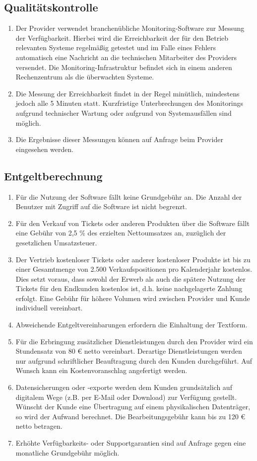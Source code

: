 \documentclass{terms}
\begin{document}
\subsection{Qualitätskontrolle}
\begin{enumerate}
\item Der Provider verwendet branchenübliche Monitoring-Software zur Messung der Verfügbarkeit. Hierbei wird die Erreichbarkeit der für den Betrieb relevanten Systeme regelmäßig getestet und im Falle eines Fehlers automatisch eine Nachricht an die technischen Mitarbeiter des Providers versendet. Die Monitoring-Infrastruktur befindet sich in einem anderen Rechenzentrum als die überwachten Systeme.
\item Die Messung der Erreichbarkeit findet in der Regel minütlich, mindestens jedoch alle 5 Minuten statt. Kurzfristige Unterbrechungen des Monitorings aufgrund technischer Wartung oder aufgrund von Systemausfällen sind möglich.
\item Die Ergebnisse dieser Messungen können auf Anfrage beim Provider eingesehen werden.
\end{enumerate}

\subsection{Entgeltberechnung}
\label{entgelt}
\begin{enumerate}
\item Für die Nutzung der Software fällt keine Grundgebühr an. Die Anzahl der Benutzer mit Zugriff auf die Software ist nicht begrenzt.
\item Für den Verkauf von Tickets oder anderen Produkten über die Software fällt eine Gebühr von 2,5 \% des erzielten Nettoumsatzes an, zuzüglich der gesetzlichen Umsatzsteuer.
\item Der Vertrieb kostenloser Tickets oder anderer kostenloser Produkte ist bis zu einer Gesamtmenge von 2.500 Verkaufspositionen pro Kalenderjahr kostenlos. Dies setzt voraus, dass sowohl der Erwerb als auch die spätere Nutzung der Tickets für den Endkunden kostenlos ist, d.h. keine nachgelagerte Zahlung erfolgt. Eine Gebühr für höhere Volumen wird zwischen Provider und Kunde individuell vereinbart.
\item Abweichende Entgeltvereinbarungen erfordern die Einhaltung der Textform.
\item Für die Erbringung zusätzlicher Dienstleistungen durch den Provider wird ein Stundensatz von 80 € netto vereinbart. Derartige Dienstleistungen werden nur aufgrund schriftlicher Beauftragung durch den Kunden durchgeführt. Auf Wunsch kann ein Kostenvoranschlag angefertigt werden.
\item Datensicherungen oder -exporte werden dem Kunden grundsätzlich auf digitalem Wege (z.B. per E-Mail oder Download) zur Verfügung gestellt. Wünscht der Kunde eine Übertragung auf einem physikalischen Datenträger, so wird der Aufwand berechnet. Die Bearbeitungsgebühr kann bis zu 120 € netto betragen.
\item Erhöhte Verfügbarkeits- oder Supportgarantien sind auf Anfrage gegen eine monatliche Grundgebühr möglich.
\end{enumerate}
\end{document}

